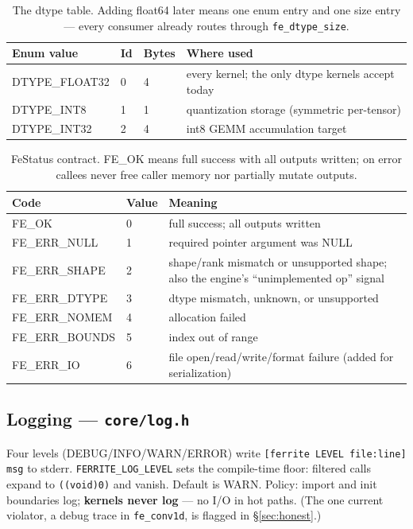 \documentclass[11pt,a4paper]{article}
\begin{document}
\begin{table}[h]
\centering
\begin{tabular}{@{}llll@{}}
\toprule
\textbf{Enum value} & \textbf{Id} & \textbf{Bytes} & \textbf{Where used} \\
\midrule
DTYPE\_FLOAT32 & 0 & 4 & every kernel; the only dtype kernels accept today\\
DTYPE\_INT8 & 1 & 1 & quantization storage (symmetric per-tensor)\\
DTYPE\_INT32 & 2 & 4 & int8 GEMM accumulation target\\
\bottomrule
\end{tabular}
\caption{The dtype table. Adding float64 later means one enum entry and one
size entry --- every consumer already routes through \texttt{fe\_dtype\_size}.}
\end{table}

\begin{table}[h]
\centering
\small
\begin{tabularx}{\textwidth}{@{}ll X@{}}
\toprule
\textbf{Code} & \textbf{Value} & \textbf{Meaning} \\
\midrule
FE\_OK & 0 & full success; all outputs written\\
FE\_ERR\_NULL & 1 & required pointer argument was NULL\\
FE\_ERR\_SHAPE & 2 & shape/rank mismatch or unsupported shape; also the engine's ``unimplemented op'' signal\\
FE\_ERR\_DTYPE & 3 & dtype mismatch, unknown, or unsupported\\
FE\_ERR\_NOMEM & 4 & allocation failed\\
FE\_ERR\_BOUNDS & 5 & index out of range\\
FE\_ERR\_IO & 6 & file open/read/write/format failure (added for serialization)\\
\bottomrule
\end{tabularx}
\caption{FeStatus contract. FE\_OK means full success with all outputs written;
on error callees never free caller memory nor partially mutate outputs.}
\end{table}

\subsection{Logging --- \texttt{core/log.h}}

Four levels (DEBUG/INFO/WARN/ERROR) write \texttt{[ferrite LEVEL file:line] msg}
to stderr. \texttt{FERRITE\_LOG\_LEVEL} sets the compile-time floor: filtered
calls expand to \texttt{((void)0)} and vanish. Default is WARN. Policy: import
and init boundaries log; \textbf{kernels never log} --- no I/O in hot paths.
(The one current violator, a debug trace in \texttt{fe\_conv1d}, is flagged in
\S\ref{sec:honest}.)
\end{document}
